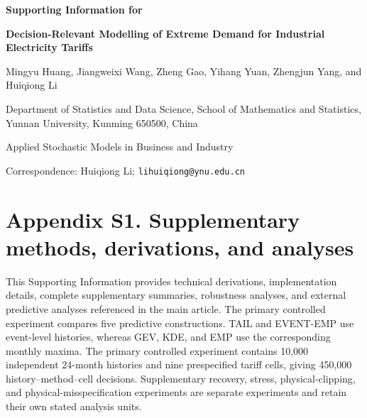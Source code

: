 \documentclass[AMA,Times1COL]{WileyNJDv5}
\begin{document}

\begin{center}
\vspace*{0.12\textheight}

{\fontsize{11}{14}\selectfont\bfseries
Supporting Information for\par}

\vspace{8pt}

{\fontsize{18}{22}\selectfont\bfseries
Decision-Relevant Modelling of Extreme Demand for
Industrial Electricity Tariffs\par}

\vspace{14pt}

{\fontsize{10}{13}\selectfont
Mingyu Huang, Jiangweixi Wang, Zheng Gao, Yihang Yuan, Zhengjun Yang, and Huiqiong Li\par}

\vspace{4pt}

{\fontsize{9}{12}\selectfont
Department of Statistics and Data Science, School of Mathematics and Statistics, Yunnan University, Kunming 650500, China\par}

\vspace{10pt}

{\fontsize{9}{12}\selectfont
Applied Stochastic Models in Business and Industry\par}

{\fontsize{9}{12}\selectfont Correspondence: Huiqiong Li; \texttt{lihuiqiong@ynu.edu.cn}\par}

\end{center}

\vfill
\clearpage
\resetlinenumber[1]\linenumbers



\section*{Appendix S1. Supplementary methods, derivations, and analyses}

This Supporting Information provides technical derivations,
implementation details, complete supplementary summaries, robustness
analyses, and external predictive analyses referenced in the main
article. The primary controlled experiment compares five predictive
constructions. TAIL and EVENT-EMP use event-level histories, whereas
GEV, KDE, and EMP use the corresponding monthly maxima. The primary controlled
experiment contains 10,000 independent 24-month histories and nine
prespecified tariff cells, giving 450,000
history--method--cell decisions. Supplementary recovery, stress,
physical-clipping, and physical-misspecification experiments are
separate experiments and retain their own stated analysis units.
\end{document}
